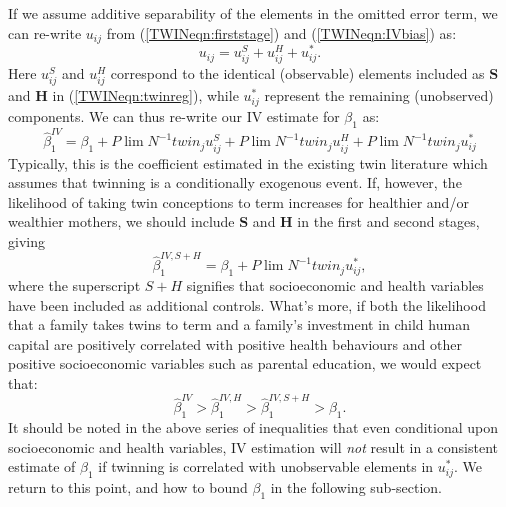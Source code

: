 If we assume additive separability of the elements in the omitted error term, we
can re-write $u_{ij}$ from (\ref{TWINeqn:firststage}) and (\ref{TWINeqn:IVbias}) 
as:
\[ u_{ij}=u^S_{ij}+u^H_{ij}+u^*_{ij}. \]
Here $u^S_{ij}$ and $u^H_{ij}$ correspond to the identical (observable) elements
included as $\bm{S}$ and $\bm{H}$ in (\ref{TWINeqn:twinreg}), while $u^*_{ij}$
represent the remaining (unobserved) components.  We can thus re-write our IV
estimate for $\beta_1$ as:
\begin{equation}
\label{TWINeqn:betabias}
\hat\beta_1^{IV} = \beta_1 + P\lim N^{-1}twin_ju^S_{ij} + 
P\lim N^{-1}twin_ju^H_{ij} + P\lim N^{-1}twin_ju^*_{ij}
\end{equation}
Typically, this is the coefficient estimated in the existing twin literature 
which assumes that twinning is a conditionally exogenous event.  If, however, the 
likelihood of taking twin conceptions to term increases for healthier and/or 
wealthier mothers, we should include $\bm{S}$ and $\bm{H}$ in the first and 
second stages, giving
\begin{equation}
\label{TWINeqn:betacloser}
\hat\beta_1^{IV,S+H} = \beta_1 + P\lim N^{-1}twin_ju^*_{ij},
\end{equation}
where the superscript $S+H$ signifies that socioeconomic and health variables 
have been included as additional controls.  What's more, if both the likelihood
that a family takes twins to term and a family's investment in child human capital 
are positively correlated with positive health behaviours and other positive 
socioeconomic variables such as parental education, we would expect that:
\[
\hat\beta_1^{IV}>\hat\beta_1^{IV,H}>\hat\beta_1^{IV,S+H}>\beta_1.
\]
It should be noted in the above series of inequalities that even conditional upon
socioeconomic and health variables, IV estimation will \emph{not} result in a
consistent estimate of $\beta_1$ if twinning is correlated with unobservable
elements in $u^*_{ij}$.  We return to this point, and how to bound $\beta_1$ in
the following sub-section.

